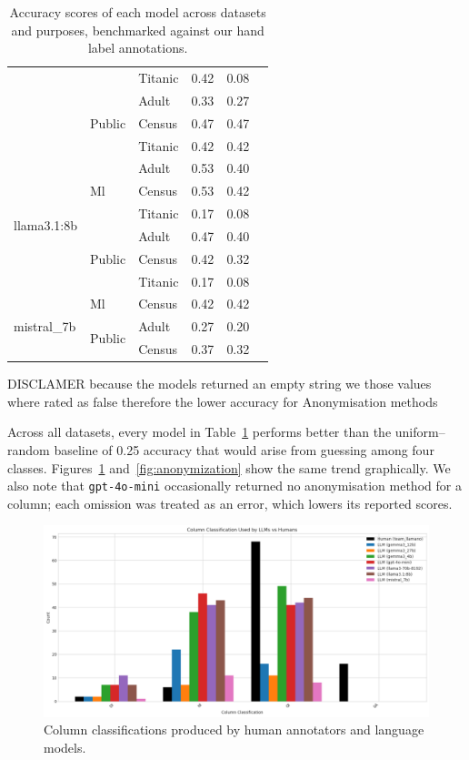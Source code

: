 \documentclass{article}
\begin{document}
\begin{table}[h!]
\begin{tabular}{lllccl}
 &  & Titanic & 0.42 & 0.08 \\
 & \multirow{3}{*}{Public} & Adult & 0.33 & 0.27 \\
 &  & Census & 0.47 & 0.47 \\
 &  & Titanic & 0.42 & 0.42 \\
\midrule
\multirow{6}{*}{llama3.1:8b} & \multirow{3}{*}{Ml} & Adult & 0.53 & 0.40 \\
 &  & Census & 0.53 & 0.42 \\
 &  & Titanic & 0.17 & 0.08 \\
 & \multirow{3}{*}{Public} & Adult & 0.47 & 0.40 \\
 &  & Census & 0.42 & 0.32 \\
 &  & Titanic & 0.17 & 0.08 \\
\midrule
\multirow{3}{*}{mistral\_7b} & Ml & Census & 0.42 & 0.42 \\
 & \multirow{2}{*}{Public} & Adult & 0.27 & 0.20 \\
 &  & Census & 0.37 & 0.32 \\
\bottomrule
\end{tabular}
\caption{Accuracy scores of each model across datasets and purposes, benchmarked against our hand label annotations.}
\label{tab:llm_eval_grouped}
\end{table}


DISCLAMER because the models returned an empty string we those values where rated as false therefore the lower accuracy for Anonymisation methods

Across all datasets, every model in Table~\ref{tab:llm_eval_grouped} performs better than the uniform–random baseline of 0.25 accuracy that would arise from guessing among four classes.  Figures~\ref{fig:col} and~\ref{fig:anonymization} show the same trend graphically.  We also note that \texttt{gpt-4o-mini} occasionally returned no anonymisation method for a column; each omission was treated as an error, which lowers its reported scores.



\newpage

\begin{figure}[!htbp]
    \centering
    \includegraphics[width=\linewidth]{images/plot_eval2.png}
    \caption{Column classifications produced by human annotators and language models.}
    \label{fig:col}
\end{figure}
\end{document}
